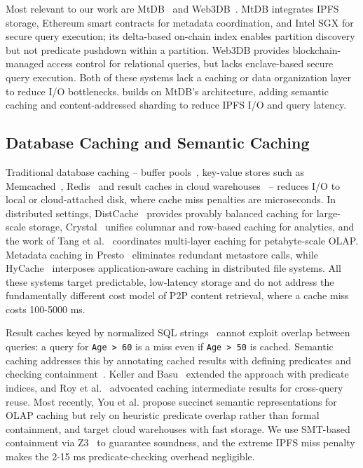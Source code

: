 Most relevant to our work are MtDB~\cite{hossain2025mtdb} and Web3DB~\cite{mukherjee2025web3db}. MtDB integrates IPFS storage, Ethereum smart contracts for metadata coordination, and Intel SGX for secure query execution; its delta-based on-chain index enables partition discovery but not predicate pushdown within a partition. Web3DB provides blockchain-managed access control for relational queries, but lacks enclave-based secure query execution. Both of these systems lack a caching or data organization layer to reduce I/O bottlenecks. \ours{} builds on MtDB's architecture, adding semantic caching and content-addressed sharding to reduce IPFS I/O and query latency.


\subsection{Database Caching and Semantic Caching}
\label{sec:caching}

Traditional database caching -- buffer pools~\cite{graefe2011modern}, key-value stores such as Memcached~\cite{fitzpatrick2004distributed}, Redis~\cite{redis2009} and result caches in cloud warehouses~\cite{dageville2016snowflake, melnik2010dremel} -- reduces I/O to local or cloud-attached disk, where cache miss penalties are microseconds. In distributed settings, DistCache~\cite{liu2019distcache} provides provably balanced caching for large-scale storage, Crystal~\cite{durner2021crystal} unifies columnar and row-based caching for analytics, and the work of Tang et al.~\cite{tang2024data} coordinates multi-layer caching for petabyte-scale OLAP. Metadata caching in Presto~\cite{wang2022metadata} eliminates redundant metastore calls, while HyCache~\cite{zhao2013hycache} interposes application-aware caching in distributed file systems. All these systems target predictable, low-latency storage and do not address the fundamentally different cost model of P2P content retrieval, where a cache miss costs 100-5000 ms.

Result caches keyed by normalized SQL strings~\cite{dageville2016snowflake, melnik2010dremel} cannot exploit overlap between queries: a query for \texttt{Age > 60} is a miss even if \texttt{Age > 50} is cached. Semantic caching addresses this by annotating cached results with defining predicates and checking containment~\cite{dar1996semantic}. Keller and Basu~\cite{keller1996predicate} extended the approach with predicate indices, and Roy et al.~\cite{roy2000don} advocated caching intermediate results for cross-query reuse. Most recently, You et al. \cite{you2025soc} propose succinct semantic representations for OLAP caching but rely on heuristic predicate overlap rather than formal containment, and target cloud warehouses with fast storage. We use SMT-based containment via Z3~\cite{de2008z3} to guarantee soundness, and the extreme IPFS miss penalty makes the 2-15 ms predicate-checking overhead negligible.

